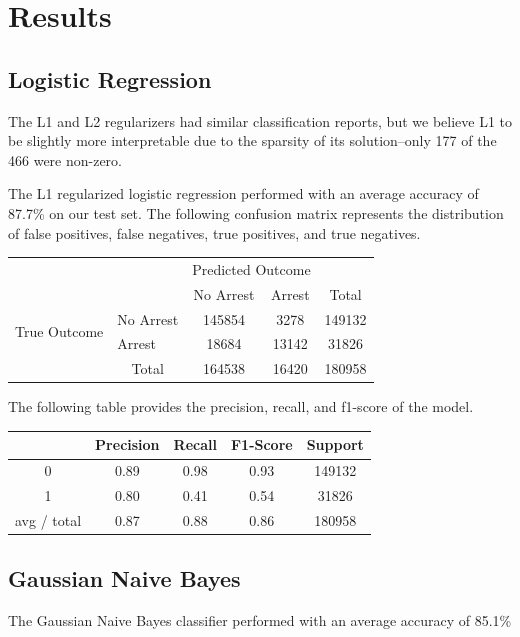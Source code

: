 \documentclass[10pt]{SelfArx} %
\begin{document}
\section{Results}
    \subsection{Logistic Regression}
    The L1 and L2 regularizers had similar classification reports, but we believe L1 to be slightly more interpretable due to the sparsity of its solution--only 177 of the 466 were non-zero.

    The L1 regularized logistic regression performed with an average accuracy of 87.7\% on our test set. The following confusion matrix represents the distribution of false positives, false negatives, true positives, and true negatives.

    \begin{tabular}{l|l|c|c|c}
    \multicolumn{2}{c}{}&\multicolumn{2}{c}{Predicted Outcome}&\\
    \cline{3-4}
    \multicolumn{2}{c|}{}&No Arrest&Arrest&\multicolumn{1}{c}{Total}\\
    \cline{2-4}
    \multirow{2}{*}{True Outcome}& No Arrest & 145854 & 3278 & 149132\\
    \cline{2-4}
    & Arrest & 18684  & 13142 & 31826\\
    \cline{2-4}
    \multicolumn{1}{c}{} & \multicolumn{1}{c}{Total} & \multicolumn{1}{c}{164538} & \multicolumn{    1}{c}{16420} &
    \multicolumn{1}{c}{180958}\\
    \end{tabular}

    The following table provides the precision, recall, and f1-score of the model.

    \begin{center}
        \begin{tabular}{|c | c | c | c| c|}
        \hline
        & Precision & Recall & F1-Score & Support \\ [0.5ex]
        \hline\hline
        0 & 0.89 & 0.98 & 0.93 & 149132 \\
        \hline
        1 & 0.80 & 0.41 & 0.54 & 31826 \\
        \hline
        avg / total & 0.87 & 0.88 & 0.86 & 180958 \\
        \hline
        \hline
        \end{tabular}
    \end{center}

    \subsection{Gaussian Naive Bayes}
    The Gaussian Naive Bayes classifier performed with an average accuracy of 85.1\%
\end{document}
